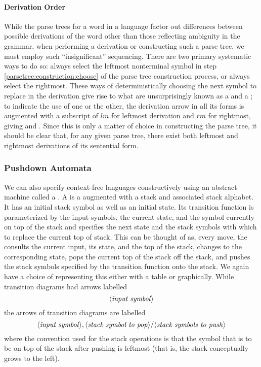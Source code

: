 \paragraph{Derivation Order} While the parse trees for a word in a language factor out differences between possible derivations of the word other than those reflecting ambiguity in the grammar, when performing a derivation or constructing such a parse tree, we must employ such ``insignificant'' sequencing. There are two primary systematic ways to do so: always select the leftmost nonterminal symbol in step \ref{parsetree:construction:choose} of the parse tree construction process, or always select the rightmost. These ways of deterministically choosing the next symbol to replace in the derivation give rise to what are unsurprisingly known as a  and a ; to indicate the use of one or the other, the derivation arrow in all its forms is augmented with a subscript of $lm$ for leftmost derivation and $rm$ for rightmost, giving \derives[][lm] and \derives[][rm]. Since this is only a matter of choice in constructing the parse tree, it should be clear that, for any given parse tree, there exist both leftmost and rightmost derivations of its sentential form. %

\subsubsection{Pushdown Automata}
We can also specify context-free languages constructively using an abstract machine called a . A \PDA is a \FA augmented with a stack and associated stack alphabet. It has an initial stack symbol as well as an initial state. Its transition function is parameterized by the input symbols, the current state, and the symbol currently on top of the stack and specifies the next state and the stack symbols with which to replace the current top of stack. This can be thought of as, every move, the \PDA consults the current input, its state, and the top of the stack, changes to the corresponding state, pops the current top of the stack off the stack, and pushes the stack symbols specified by the transition function onto the stack. We again have a choice of representing this either with a table or graphically. While \FA transition diagrams had arrows labelled 
\[
\langle\text{\textit{input symbol}}\rangle
\]
the arrows of \PDA transition diagrams are labelled 
\[
\langle\text{\textit{input symbol}}\rangle, \langle\text{\textit{stack symbol to pop}}\rangle / \langle\text{\textit{stack symbols to push}}\rangle
\]
where the convention used for the stack operations is that the symbol that is to be on top of the stack after pushing is leftmost (that is, the stack conceptually grows to the left).

